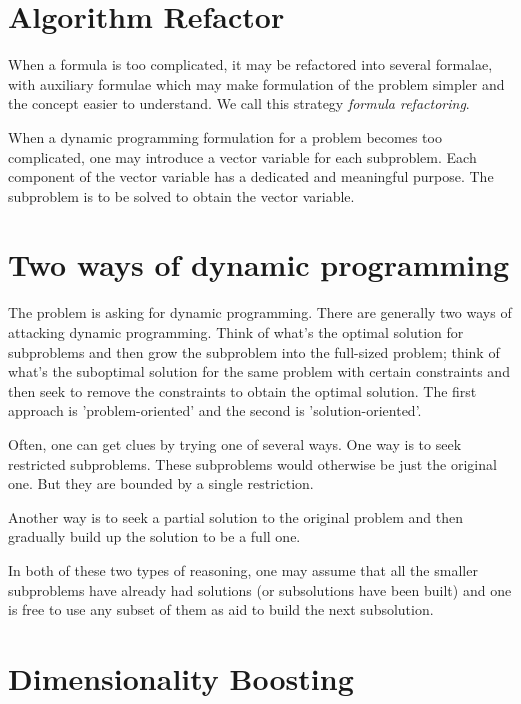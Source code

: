 \section{Algorithm Refactor}\label{sec:algorithmRefactor}

\begin{defn}
    When a formula is too complicated, it may be refactored into several formalae, with auxiliary
    formulae which may make formulation of the problem simpler and the concept easier to understand.
    We call this strategy \emph{formula refactoring}.
\end{defn}

\begin{defn}
    When a dynamic programming formulation for a problem becomes too complicated, one may
    introduce a vector variable for each subproblem.
    Each component of the vector variable has a dedicated and meaningful purpose.
    The subproblem is to be solved to obtain the vector variable.
\end{defn}

\section{Two ways of dynamic programming}\label{sec:twoWaysOfDynamicProgramming}

The problem is asking for dynamic programming.
There are generally two ways of attacking dynamic programming.
Think of what's the optimal solution for subproblems and then grow the subproblem into the
full-sized problem;
think of what's the suboptimal solution for the same problem with certain
constraints and then seek to remove the constraints to obtain the optimal solution.
The first approach is 'problem-oriented' and the second is 'solution-oriented'.

Often, one can get clues by trying one of several ways.
One way is to seek restricted subproblems.
These subproblems would otherwise be just the original one.
But they are bounded by a single restriction.

Another way is to seek a partial solution to the original problem and then gradually build up the
solution to be a full one.

In both of these two types of reasoning, one may assume that all the smaller subproblems
have already had solutions (or subsolutions have been built) and one is free to use any subset of
them as aid to build the next subsolution.

\section{Dimensionality Boosting}\label{sec:dimensionality-boosting}

